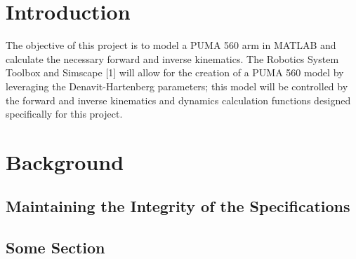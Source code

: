 \documentclass[conference]{IEEEtran}
\begin{document}
\section{Introduction}
The objective of this project is to model a PUMA 560 arm in MATLAB and calculate the necessary forward and inverse kinematics. The Robotics System Toolbox and Simscape [1] will allow for the creation of a PUMA 560 model by leveraging the Denavit-Hartenberg parameters; this model will be controlled by the forward and inverse kinematics and dynamics calculation functions designed specifically for this project.
\section{Background}

\subsection{Maintaining the Integrity of the Specifications}

\lipsum[1-2]

\subsection{Some Section}
\lipsum[3-4]
\end{document}
